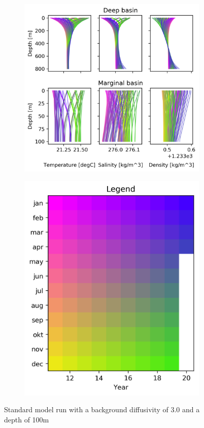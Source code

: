 \documentclass[twocolumn]{article}
\begin{document}
\begin{figure}
\begin{subfigure}[h]{0.7\textwidth}
\centering
\includegraphics[width=\textwidth,keepaspectratio]{hybrid.png}
\end{subfigure}\hfill
\begin{subfigure}[h]{0.20\textwidth}
\centering
\includegraphics[width=1.0\textwidth,keepaspectratio]{Hybrid_Legend.png}
\end{subfigure}\hfill
\caption{Standard model run with a background diffusivity of 3.0 and a depth of 100m}
\label{fig:hybrid}
\end{figure}
\end{document}
